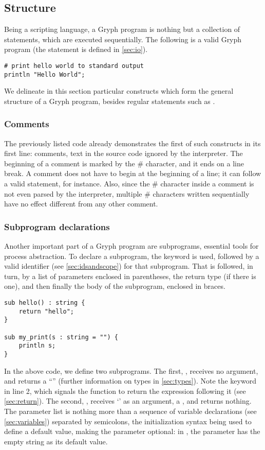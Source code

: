 \subsection{Structure}
Being a scripting language, a Gryph program is nothing but a collection of statements, which are executed sequentially. The following is a valid Gryph program (the  statement is defined in \autoref{sec:io}).

\begin{lstlisting}[language=Gryph]
# print hello world to standard output
println "Hello World";
\end{lstlisting}

We delineate in this section particular constructs which form the general structure of a Gryph program, besides regular statements such as .

\subsubsection{Comments}
The previously listed code already demonstrates the first of such constructs in its first line: comments, text in the source code ignored by the interpreter. The beginning of a comment is marked by the \# character, and it ends on a line break. A comment does not have to begin at the beginning of a line; it can follow a valid statement, for instance. Also, since the \# character inside a comment is not even parsed by the interpreter, multiple \# characters written sequentially have no effect different from any other comment.

\subsubsection{Subprogram declarations}
\label{sec:subprogram}
Another important part of a Gryph program are subprograms, essential tools for process abstraction. To declare a subprogram, the  keyword is used, followed by a valid identifier (see \autoref{sec:idsandscope}) for that subprogram. That is followed, in turn, by a list of parameters enclosed in parentheses, the return type (if there is one), and then finally the body of the subprogram, enclosed in braces.
\begin{lstlisting}[language=Gryph]
sub hello() : string {
	return "hello";
}

sub my_print(s : string = "") {
	println s;
}
\end{lstlisting}
In the above code, we define two subprograms. The first, , receives no argument, and returns a ``'' (further information on types in \autoref{sec:types}). Note the  keyword in line 2, which signals the function to return the expression following it (see \autoref{sec:return}). The second, , receives `' as an argument, a , and returns nothing. 
The parameter list is nothing more than a sequence of variable declarations (see \autoref{sec:variables}) separated by semicolons, the initialization syntax being used to define a default value, making the parameter optional: in , the parameter  has the empty string as its default value.

